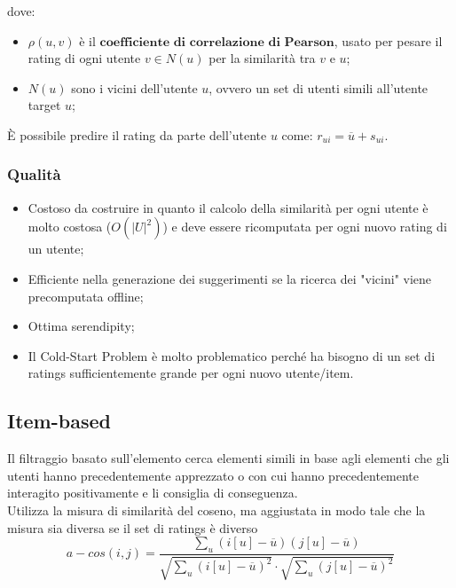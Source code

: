             dove:
                \begin{itemize}
                    \item $\rho(u,v)$ è il $\textbf{coefficiente di correlazione di Pearson}$, usato per pesare il rating di ogni utente $v \in N(u)$ per la similarità tra $v$ e $u$;
                    \item $N(u)$ sono i vicini dell'utente $u$, ovvero un set di utenti simili all'utente target $u$;
                \end{itemize}

            È possibile predire il rating da parte dell'utente $u$ come: $r_{ui} = \overline{u} + s_{ui}$.

            \subsubsection{Qualità}
                \begin{itemize}
                    \item Costoso da costruire in quanto il calcolo della similarità per ogni utente è molto costosa ($O(|U|^{2})$) e deve essere ricomputata per ogni nuovo rating di un utente;
                    \item Efficiente nella generazione dei suggerimenti se la ricerca dei "vicini" viene precomputata offline;
                    \item Ottima serendipity;
                    \item Il Cold-Start Problem è molto problematico perché ha bisogno di un set di ratings sufficientemente grande per ogni nuovo utente/item.
                \end{itemize}

        \subsection{Item-based}
            Il filtraggio basato sull'elemento cerca elementi simili in base agli elementi che gli utenti hanno precedentemente apprezzato o con cui hanno precedentemente interagito positivamente e li consiglia di conseguenza.
            \\[1\baselineskip]
            Utilizza la misura di similarità del coseno, ma aggiustata in modo tale che la misura sia diversa se il set di ratings è diverso
                $$ a-cos(i,j) = \frac{\sum_{u}{(i[u] - \overline{u}) (j[u] - \overline{u})}}{\sqrt{\sum_{u}{(i[u] - \overline{u})^{2}}} \cdot \sqrt{\sum_{u}{(j[u] - \overline{u})^{2}}}} $$

